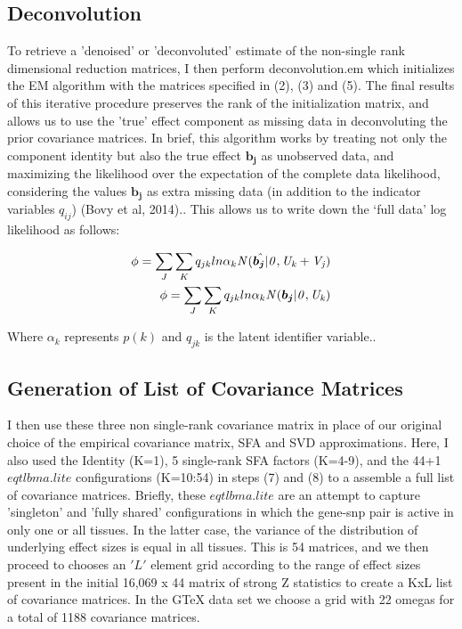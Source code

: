 \documentclass[10pt,letterpaper]{article}
\begin{document}
\subsection{Deconvolution}
To retrieve a 'denoised' or 'deconvoluted' estimate of the non-single rank dimensional reduction matrices, I then perform deconvolution.em which initializes the EM algorithm with  the matrices specified in (2), (3) and (5). The final results of this iterative procedure preserves the rank of the initialization matrix, and allows us to use the 'true' effect component as missing data in deconvoluting the prior covariance matrices. In brief, this algorithm works by treating not only the component identity but also the true effect $\bm{{b}_{j}}$  as unobserved data, and maximizing the likelihood over the expectation of the complete data likelihood, considering the values $\bm{{b}_{j}}$ as extra missing data (in addition to the indicator variables $q_{ij}$) (Bovy et al, 2014).. This allows us to write down the `full data' log likelihood as follows:

\begin{equation}

\begin{aligned}
\phi=\sum_{J} \sum_{K} q_{jk} ln \alpha_{k} \it{N}(\hat{\bm{{b}_{j}}}|0,U_{k}+V_{j})\\
\phi=\sum_{J} \sum_{K} q_{jk} ln \alpha_{k} \it{N}(\bm{{b}_{j}}|0,U_{k})

\end{aligned}
\end{equation}



Where $\alpha_{k}$ represents $p(k)$ and $q_{jk}$ is the latent identifier variable..


\subsection{Generation of List of Covariance Matrices}
I then use these three non single-rank covariance matrix in place of our original choice of the empirical covariance matrix, SFA and SVD approximations. Here, I also used the Identity (K=1), 5 single-rank SFA factors (K=4-9), and the 44+1 $eqtlbma.lite$ configurations (K=10:54) in steps (7) and (8) to a assemble a full list of covariance matrices. Briefly, these  $eqtlbma.lite$ are an attempt to capture 'singleton' and 'fully shared' configurations in which the gene-snp pair is active in only one or all tissues. In the latter case, the variance of the distribution of underlying effect sizes is equal in all tissues.  This is 54 matrices, and we then proceed to chooses an $'L'$ element grid according to the range of effect sizes present in the initial 16,069 x 44 matrix of strong Z statistics to create a KxL list of covariance matrices. In the GTeX data set we choose a grid with 22 omegas for a total of 1188 covariance matrices.
\end{document}
